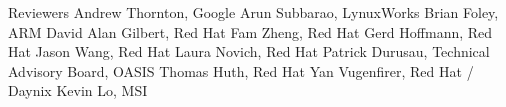 \begin{oasistitlesection}{Reviewers}
Andrew Thornton,  Google \newline
Arun Subbarao,	LynuxWorks	\newline
Brian Foley,  ARM \newline
David Alan Gilbert, Red Hat \newline
Fam Zheng, Red Hat	\newline
Gerd Hoffmann, Red Hat	\newline
Jason Wang, Red Hat \newline
Laura Novich, Red Hat	\newline
Patrick Durusau,	Technical Advisory Board, OASIS	\newline
Thomas Huth,	Red Hat	\newline
Yan Vugenfirer, Red Hat / Daynix	\newline
Kevin Lo,	MSI	\newline
\end{oasistitlesection}
